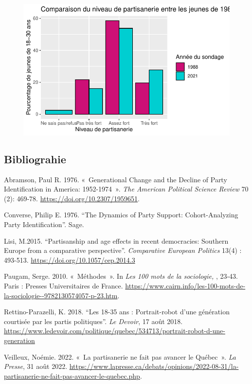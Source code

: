 \documentclass[
  letterpaper,
  DIV=11,
  numbers=noendperiod]{scrartcl}
\begin{document}
\begin{figure}[H]

{\centering \includegraphics{TP2_FAS1001_Saffioti_files/figure-pdf/unnamed-chunk-1-1.pdf}

}

\end{figure}

\hypertarget{bibliograhie}{%
\subsection{Bibliograhie}\label{bibliograhie}}

Abramson, Paul R. 1976. «~Generational Change and the Decline of Party
Identification in America: 1952-1974~». \emph{The American Political
Science Review} 70 (2): 469‑78. \url{https://doi.org/10.2307/1959651}.

Converse, Philip E. 1976. ``The Dynamics of Party Support:
Cohort-Analyzing Party Identification''. Sage.

Lisi, M.2015. ``Partisanship and age effects in recent democracies:
Southern Europe from a comparative perspective''. \emph{Comparative
European Politics} 13(4) : 493-513.
\url{https://doi.org/10.1057/cep.2014.3}

Paugam, Serge. 2010. «~Méthodes~». In \emph{Les 100 mots de la
sociologie,} , 23‑43. Paris : Presses Universitaires de France.
\url{https://www.cairn.info/les-100-mots-de-la-sociologie--9782130574057-p-23.htm}.

Rettino-Parazelli, K. 2018. ``Les 18-35 ans : Portrait-robot d'une
génération courtisée par les partis politiques''. \emph{Le Devoir}, 17
août 2018.
\url{https://www.ledevoir.com/politique/quebec/534713/portrait-robot-d-une-generation}

Veilleux, Noémie. 2022. «~La partisanerie ne fait pas avancer le
Québec~». \emph{La Presse}, 31 août 2022.
\url{https://www.lapresse.ca/debats/opinions/2022-08-31/la-partisanerie-ne-fait-pas-avancer-le-quebec.php}.
\end{document}
